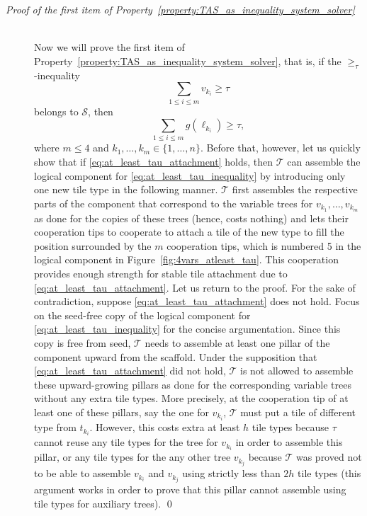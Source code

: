 \documentclass{article}
\theoremstyle{remark}
\theoremstyle{definition}
\newcommand{\tas}{\ensuremath{\mathcal{T}}}
\begin{document}
\begin{description}

\item[{\it Proof of the first item of Property~\ref{property:TAS_as_inequality_system_solver}}] \ \\
Now we will prove the first item of Property~\ref{property:TAS_as_inequality_system_solver}, that is, if the $\ge_\tau$-inequality 
\begin{equation}\label{eq:at_least_tau_inequality}
	\sum_{1 \le i \le m} v_{k_i} \ge \tau
\end{equation}
belongs to $\mathcal{S}$, then 
\begin{equation}\label{eq:at_least_tau_attachment}
	\sum_{1 \le i \le m} g(\ell_{k_i}) \ge \tau,
\end{equation} 
where $m \le 4$ and $k_1, \ldots, k_m \in \{1, \ldots, n\}$. 
Before that, however, let us quickly show that if \eqref{eq:at_least_tau_attachment} holds, then $\tas$ can assemble the logical component for \eqref{eq:at_least_tau_inequality} by introducing only one new tile type in the following manner. 
$\tas$ first assembles the respective parts of the component that correspond to the variable trees for $v_{k_1}, \ldots, v_{k_m}$ as done for the copies of these trees (hence, costs nothing) and lets their cooperation tips to cooperate to attach a tile of the new type to fill the position surrounded by the $m$ cooperation tips, which is numbered 5 in the logical component in Figure~\ref{fig:4vars_atleast_tau}.
This cooperation provides enough strength for stable tile attachment due to \eqref{eq:at_least_tau_attachment}. 
Let us return to the proof. 
For the sake of contradiction, suppose \eqref{eq:at_least_tau_attachment} does not hold. 
Focus on the seed-free copy of the logical component for \eqref{eq:at_least_tau_inequality} for the concise argumentation. 
Since this copy is free from seed, $\tas$ needs to assemble at least one pillar of the component upward from the scaffold. 
Under the supposition that \eqref{eq:at_least_tau_attachment} did not hold, $\tas$ is not allowed to assemble these upward-growing pillars as done for the corresponding variable trees without any extra tile types. 
More precisely, at the cooperation tip of at least one of these pillars, say the one for $v_{k_i}$, $\tas$ must put a tile of different type from $t_{k_i}$. 
However, this costs extra at least $h$ tile types because $\tau$ cannot reuse any tile types for the tree for $v_{k_i}$ in order to assemble this pillar, or any tile types for the any other tree $v_{k_j}$ because $\tas$ was proved not to be able to assemble $v_{k_i}$ and $v_{k_j}$ using strictly less than $2h$ tile types (this argument works in order to prove that this pillar cannot assemble using tile types for auxiliary trees). 
\qed
\end{description}
\end{document}

